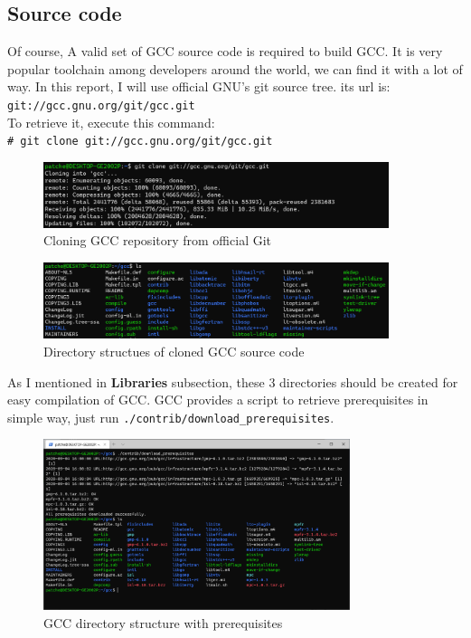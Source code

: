 \documentclass{article}
\begin{document}
\subsection{Source code}
Of course, A valid set of GCC source code is required to build GCC. It is very popular
toolchain among developers around the world, we can find it with a lot of way. In this
report, I will use official GNU's git source tree. its url is: \\

\texttt{git://gcc.gnu.org/git/gcc.git}\\

To retrieve it, execute this command:\\

\texttt{\# git clone git://gcc.gnu.org/git/gcc.git}\\

\begin{figure}[!htbp]
    \centering
    \includegraphics[width=0.9\textwidth]{images/2.png}
    \caption{Cloning GCC repository from official Git}
\end{figure}

\begin{figure}[!htbp]
    \centering
    \includegraphics[width=0.9\textwidth]{images/3.png}
    \caption{Directory structues of cloned GCC source code}
\end{figure}

As I mentioned in \textbf{Libraries} subsection, these 3 directories should be created
for easy compilation of GCC. GCC provides a script to retrieve prerequisites in simple way,
just run \texttt{./contrib/download\_prerequisites}.

\begin{figure}[!htbp]
    \centering
    \includegraphics[width=0.8\textwidth]{images/5.png}
    \caption{GCC directory structure with prerequisites}
\end{figure}
\end{document}
